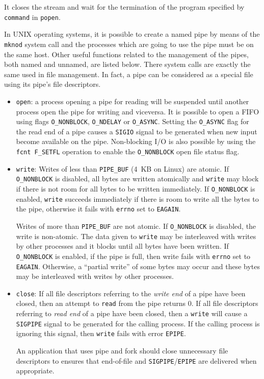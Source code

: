 It closes the stream and wait for the termination of the program specified by \texttt{command} in \texttt{popen}.

\medskip
In UNIX operating systems, it is possible to create a named pipe by means of the \texttt{mknod} system call and the processes which are going to use the pipe must be on the same host. Other useful functions related to the management of the pipes, both named and unnamed, are listed below. There system calls are exactly the same used in file management. In fact, a pipe can be considered as a special file using its pipe’s file descriptors.
\begin{itemize}
\item \texttt{open}: a process opening a pipe for reading will be suspended until another process open the pipe for writing and viceversa. It is possible to open a FIFO using flags \texttt{O\_NONBLOCK}, \texttt{O\_NDELAY} or \texttt{O\_ASYNC}. Setting the \texttt{O\_ASYNC} flag for the read end of a pipe causes a \texttt{SIGIO} signal to be generated when new input become available on the pipe. Non-blocking I/O is also possible by using the \texttt{fcnt F\_SETFL} operation to enable the \texttt{O\_NONBLOCK} open file status flag.
\item \texttt{write}: Writes of less than \texttt{PIPE\_BUF} (4~KB on Linux) are atomic. If \texttt{O\_NONBLOCK} is disabled, all bytes are written atomically and \texttt{write} may block if there is not room for all bytes to be written immediately. If \texttt{O\_NONBLOCK} is enabled, \texttt{write} succeeds immediately if there is room to write all the bytes to the pipe, otherwise it fails with \texttt{errno} set to \texttt{EAGAIN}.

Writes of more than \texttt{PIPE\_BUF} are not atomic. If \texttt{O\_NONBLOCK} is disabled, the write is non-atomic. The data given to \texttt{write} may be interleaved with writes by other processes and it blocks until all bytes have been written. If \texttt{O\_NONBLOCK} is enabled, if the pipe is full, then write fails with \texttt{errno} set to \texttt{EAGAIN}. Otherwise, a ``partial write'' of some bytes may occur and these bytes may be interleaved with writes by other processes.
\item \texttt{close}: If all file descriptors referring to the \emph{write end} of a pipe have been closed, then an attempt to \texttt{read} from the pipe returns 0. If all file descriptors referring to \emph{read end} of a pipe have been closed, then a \texttt{write} will cause a \texttt{SIGPIPE} signal to be generated for the calling process. If the calling process is ignoring this signal, then \texttt{write} fails with error \texttt{EPIPE}.

An application that uses pipe and fork should close unnecessary file descriptors to ensures that end-of-file and \texttt{SIGPIPE}/\texttt{EPIPE} are delivered when appropriate.
\end{itemize}

